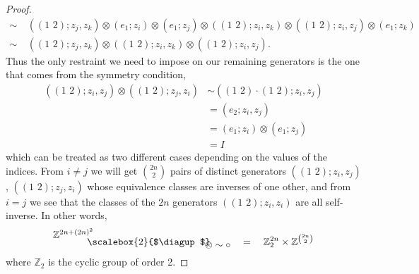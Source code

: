 \documentclass{amsbook} %
\newcommand{\bigquotient}[2]{ \raisebox{0.75\height}{$#1$} \mkern-12mu\scalebox{2}{$\diagup$}\mkern-10mu \raisebox{-0.5\height}{$#2$} }
\newcommand{\trans}[2]{( #1 \, \, #2 )}
\numberwithin{section}{chapter}
\begin{document}
\begin{proof}
\begin{align*}
    \sim~&(\trans{1}{2};z_j,z_k) \otimes (e_1;z_i) \otimes (e_1;z_j) \otimes (\trans{1}{2};z_i,z_k) \otimes (\trans{1}{2};z_i,z_j) \otimes (e_1;z_k) \\
    \sim~&(\trans{1}{2};z_j,z_k) \otimes (\trans{1}{2};z_i,z_k) \otimes (\trans{1}{2};z_i,z_j).
  \end{align*}
Thus the only restraint we need to impose on our remaining generators is the one that comes from the symmetry condition,
  \begin{align*}
  	\left(\trans{1}{2};z_i, z_j \right) \otimes \left(\trans{1}{2};z_j, z_i \right) & \sim \left(\trans{1}{2} \cdot \trans{1}{2};z_i, z_j \right) \\
  	&= (e_2; z_i, z_j) \\
  	&= (e_1; z_i) \otimes (e_1; z_j) \\
  	&= I
  \end{align*}
which can be treated as two different cases depending on the values of the indices. From $i \neq j$ we will get $\binom{2n}{2}$ pairs of distinct generators $(\trans{1}{2};z_i, z_j)$, $(\trans{1}{2};z_j, z_i)$ whose equivalence classes are inverses of one other, and from $i = j$ we see that the classes of the $2n$ generators $(\trans{1}{2};z_i, z_i)$ are all self-inverse. In other words,
\[ \bigquotient{\mathbb{Z}^{2n + (2n)^2}}{\otimes \sim \circ} \quad = \quad \mathbb{Z}_2^{2n} \times \mathbb{Z}^{\binom{2n}{2}} \]
where $\mathbb{Z}_2$ is the cyclic group of order 2.


\end{proof}
\end{document}

